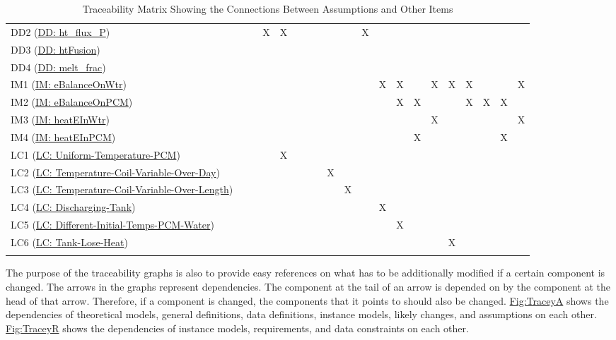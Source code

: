 \documentclass[12pt]{article}
\begin{document}
\begin{longtable}{l l l l l l l l l l l l l l l l l l l l}
\\
DD2 (\hyperref[DD:ht.flux.P]{DD: ht\_flux\_P}) &  &  & X & X &  &  &  &  &  & X &  &  &  &  &  &  &  &  & 
\\
DD3 (\hyperref[DD:htFusion]{DD: htFusion}) &  &  &  &  &  &  &  &  &  &  &  &  &  &  &  &  &  &  & 
\\
DD4 (\hyperref[DD:melt.frac]{DD: melt\_frac}) &  &  &  &  &  &  &  &  &  &  &  &  &  &  &  &  &  &  & 
\\
IM1 (\hyperref[IM:eBalanceOnWtr]{IM: eBalanceOnWtr}) &  &  &  &  &  &  &  &  &  &  & X & X &  & X & X & X &  &  & X
\\
IM2 (\hyperref[IM:eBalanceOnPCM]{IM: eBalanceOnPCM}) &  &  &  &  &  &  &  &  &  &  &  & X & X &  &  & X & X & X & 
\\
IM3 (\hyperref[IM:heatEInWtr]{IM: heatEInWtr}) &  &  &  &  &  &  &  &  &  &  &  &  &  & X &  &  &  &  & X
\\
IM4 (\hyperref[IM:heatEInPCM]{IM: heatEInPCM}) &  &  &  &  &  &  &  &  &  &  &  &  & X &  &  &  &  & X & 
\\
LC1 (\hyperref[likeChgUTP]{LC: Uniform-Temperature-PCM}) &  &  &  & X &  &  &  &  &  &  &  &  &  &  &  &  &  &  & 
\\
LC2 (\hyperref[likeChgTCVOD]{LC: Temperature-Coil-Variable-Over-Day}) &  &  &  &  &  &  &  & X &  &  &  &  &  &  &  &  &  &  & 
\\
LC3 (\hyperref[likeChgTCVOL]{LC: Temperature-Coil-Variable-Over-Length}) &  &  &  &  &  &  &  &  & X &  &  &  &  &  &  &  &  &  & 
\\
LC4 (\hyperref[likeChgDT]{LC: Discharging-Tank}) &  &  &  &  &  &  &  &  &  &  & X &  &  &  &  &  &  &  & 
\\
LC5 (\hyperref[likeChgDITPW]{LC: Different-Initial-Temps-PCM-Water}) &  &  &  &  &  &  &  &  &  &  &  & X &  &  &  &  &  &  & 
\\
LC6 (\hyperref[likeChgTLH]{LC: Tank-Lose-Heat}) &  &  &  &  &  &  &  &  &  &  &  &  &  &  & X &  &  &  & 
\\
\bottomrule
\caption{Traceability Matrix Showing the Connections Between Assumptions and Other Items}
\label{Table:Tracey3}
\end{longtable}
The purpose of the traceability graphs is also to provide easy references on what has to be additionally modified if a certain component is changed. The arrows in the graphs represent dependencies. The component at the tail of an arrow is depended on by the component at the head of that arrow. Therefore, if a component is changed, the components that it points to should also be changed. \hyperref[Figure:TraceyA]{Fig:TraceyA} shows the dependencies of theoretical models, general definitions, data definitions, instance models, likely changes, and assumptions on each other. \hyperref[Figure:TraceyR]{Fig:TraceyR} shows the dependencies of instance models, requirements, and data constraints on each other.
\end{document}
